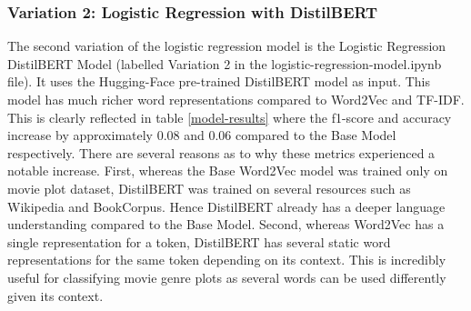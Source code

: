 \subsubsection{Variation 2: Logistic Regression with DistilBERT}
The second variation of the logistic regression model is the Logistic Regression DistilBERT Model (labelled Variation 2 in the logistic-regression-model.ipynb file). 
It uses the Hugging-Face pre-trained DistilBERT model as input. 
This model has much richer word representations compared to Word2Vec and TF-IDF. 
This is clearly reflected in table \ref{model-results} where the f1-score and accuracy increase by approximately 0.08 and 0.06 compared to the Base Model respectively. 
There are several reasons as to why these metrics experienced a notable increase. 
First, whereas the Base Word2Vec model was trained only on movie plot dataset, DistilBERT was trained on several resources such as Wikipedia and BookCorpus. 
Hence DistilBERT already has a deeper language understanding compared to the Base Model. 
Second, whereas Word2Vec has a single representation for a token, DistilBERT has several static word representations for the same token depending on its context. 
This is incredibly useful for classifying movie genre plots as several words can be used differently given its context. 